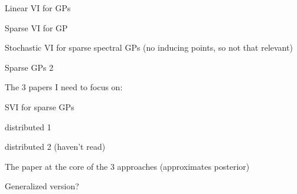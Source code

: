 \documentclass{mprop}
\theoremstyle{definition}
\begin{document}
Linear VI for GPs \cite{DBLP:conf/nips/ChengB17}

Sparse VI for GP \cite{DBLP:journals/jmlr/HensmanDS17}

Stochastic VI for sparse spectral GPs (no inducing points, so not that relevant) \cite{DBLP:conf/aaai/HoangHL17}

Sparse GPs 2 \cite{DBLP:conf/nips/GalWR14}

The 3 papers I need to focus on:

SVI for sparse GPs \cite{DBLP:conf/uai/HensmanFL13}

distributed 1 \cite{DBLP:conf/icml/HoangHL15}

distributed 2 (haven't read) \cite{DBLP:conf/icml/PengZZQ17}

The paper at the core of the 3 approaches (approximates posterior) \cite{DBLP:journals/jmlr/Titsias09}

Generalized version? \cite{DBLP:conf/icml/ShethWK15}



\end{document}
